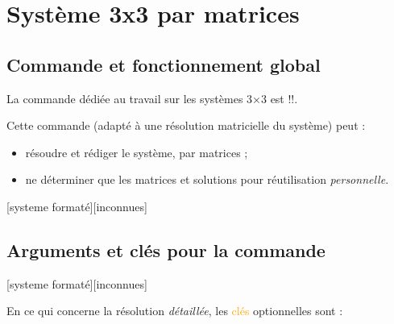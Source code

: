 \documentclass[french,a4paper,11pt]{article}
\newcommand\Cle[1]{{\small\sffamily\textlangle \textcolor{orange}{#1}\textrangle}}
\begin{document}
{{\pagebreak

\section{Système 3x3 par matrices}

\subsection{Commande et fonctionnement global}

\begin{cautionblock}
La commande dédiée au travail sur les systèmes 3×3 est \motcletex!\ResolSystemeMatrices!.

Cette commande (adapté à une résolution matricielle du système) peut :

\begin{itemize}
	\item résoudre et rédiger le système, par matrices ;
	\item ne déterminer que les matrices et solutions pour réutilisation \textit{personnelle}.
\end{itemize}
\vspace*{-\baselineskip}\leavevmode
\end{cautionblock}

\begin{DemoCode}
[systeme formaté][inconnues]
\end{DemoCode}

\begin{DemoCode}[]
\end{DemoCode}

\subsection{Arguments et clés pour la commande}

\begin{DemoCode}
[systeme formaté][inconnues]
\end{DemoCode}

\begin{tipblock}
En ce qui concerne la résolution \textit{détaillée}, les \Cle{clés} optionnelles sont :


\end{tipblock}}}
\end{document}
